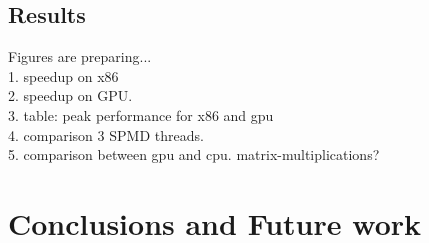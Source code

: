 \documentclass[10pt, conference, compsocconf]{IEEEtran}
\begin{document}
\subsection{Results}
Figures are preparing...\\
1. speedup on x86\\
2. speedup on GPU.\\
3. table: peak performance for x86 and gpu\\
4. comparison 3 SPMD threads.\\
5. comparison between gpu and cpu. matrix-multiplications?
\section{Conclusions and Future work}
\newpage




%
%
%
\end{document}
